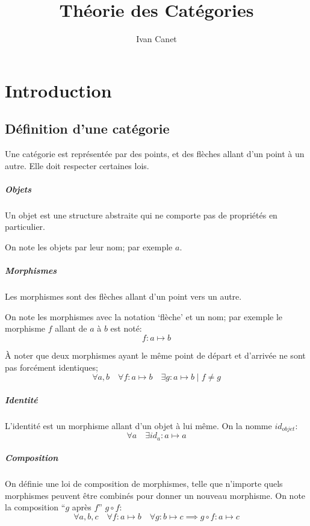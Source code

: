 \documentclass[a4paper,10pt,french,openany]{memoir}
\title{Théorie des Catégories}
\author{Ivan Canet}
\DeclareMathOperator\after{\circ}
\begin{document}
\maketitle
\tableofcontents

\chapter{Introduction}

\section{Définition d'une catégorie}

Une catégorie est représentée par des points, et des flèches allant d'un point à un autre.
Elle doit respecter certaines lois.

\paragraph{Objets}
Un objet est une structure abstraite qui ne comporte pas de propriétés en particulier.

On note les objets par leur nom;
par exemple $a$.

\paragraph{Morphismes}
Les morphismes sont des flèches allant d'un point vers un autre.

On note les morphismes avec la notation `flèche' et un nom;
par exemple le morphisme $f$ allant de $a$ à $b$ est noté:
\[ f: a \mapsto b \]

À noter que deux morphismes ayant le même point de départ et d'arrivée ne sont pas forcément identiques;
\[ \forall a, b \quad \forall f: a \mapsto b \quad \exists g: a \mapsto b \;|\; f \neq g \]

\paragraph{Identité}
L'identité est un morphisme allant d'un objet à lui même.
On la nomme $id_{objet}$:
\[ \forall a \quad \exists id_a: a \mapsto a \]

\paragraph{Composition}
On définie une loi de composition de morphismes, telle que n'importe quels morphismes peuvent être combinés pour donner un nouveau morphisme. On note la composition ``$g$ après $f$'' $g \after f$:
\[ \forall a,b,c \quad \forall f: a \mapsto b \quad \forall g: b \mapsto c \implies g \after f: a \mapsto c \]
\end{document}
